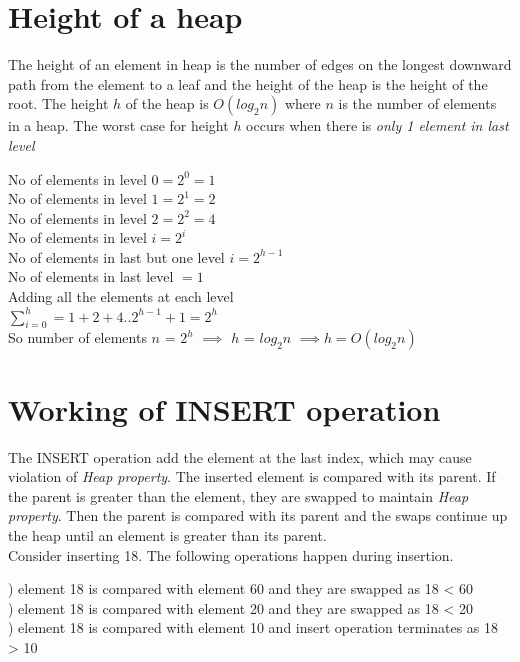 \documentclass[11pt,a4paper]{amsart}
\theoremstyle{plain}
\numberwithin{equation}{section}
\begin{document}
\section{\textbf{Height of a heap}}
The height of an element in heap is the number of edges on the longest downward path from the element to a leaf and the height of the heap is the height of the root. The height $h$ of the heap is \textbf{$O(log_2n)$} where $n$ is the number of elements in a heap. The worst case for height $h$ occurs when there is \emph{only 1 element in last level}

\indent No of elements in level $0 = 2^0 = 1$\\
\indent No of elements in level $1 = 2^1 = 2$\\
\indent No of elements in level $2 = 2^2 = 4$\\
\indent No of elements in level $i = 2^i$\\
\indent No of elements in last but one level $i = 2^{h-1}$\\
\indent No of elements in last level $= 1$\\
Adding all the elements at each level\\
\indent $\sum\limits_{i=0}^h = 1 + 2 + 4 .. 2^{h-1} + 1 = 2^h$\\
So number of elements $n$ = $2^h$
$\implies$ $h$ = $log_2n$ $\implies h=O(log_2n)$ 


\section{\textbf{Working of INSERT operation}}

The INSERT operation add the element at the last index, which may cause violation of \textit{Heap property}. The inserted element is compared with its parent. If the parent is greater than the element, they are swapped to maintain \textit{Heap property}. Then the parent is compared with its parent and the swaps continue up the heap until an element is greater than its parent.\\
\indent Consider inserting 18. The following operations happen during insertion.

) element 18 is compared with element 60 and they are swapped as 18 < 60\\
) element 18 is compared with element 20 and they are swapped as 18 < 20\\
) element 18 is compared with element 10 and insert operation terminates as 18 > 10
\end{document}
